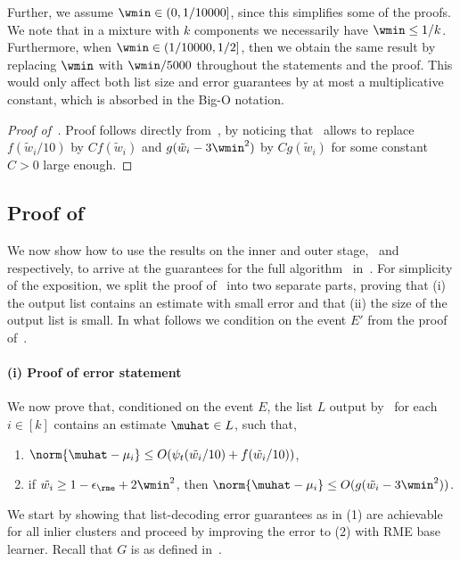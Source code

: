 Further, we assume $\wmin \in (0, 1/10000]$, since this simplifies some of the proofs. We note that in a mixture with $k$ components we necessarily have $\wmin \leq 1/k$. Furthermore, when \(\wmin \in (1/10000, 1/2]\), then we obtain the same result by replacing \(\wmin\) with \(\wmin / 5000\) throughout the statements and the proof. This would only affect both list size and error guarantees by at most a multiplicative constant, which is absorbed in the Big-O notation.

\begin{proof}[Proof of~]
Proof follows directly from~, by noticing that~ allows to replace \(f(\tilde w_i / 10)\) by \(C f(\tilde w_i)\) and \(g(\tilde w_i - 3 \wmin^2)\) by \(C g(\tilde w_i)\) for some constant \(C > 0\) large enough.
\end{proof}

\subsection{Proof of~ }
We now show how to use the results on the inner and outer stage,~ and~ respectively,
to arrive at the guarantees for the full algorithm~ in~.
For simplicity of the exposition, we split the proof of~ into two separate parts, proving that (i) the output list contains an estimate with small error and that (ii) the size of the output list is small.
In what follows we condition on the event $E'$ from the proof of~.

\paragraph{(i) Proof of error statement}

We now prove that, conditioned on the event $E$, the list \(L\) output by~  for each \(i \in [k]\) contains  an estimate \(\muhat \in L\), such that,
\begin{enumerate}[(1)]
    \item $\norm{\muhat - \mu_i} \leq O(\psi_t(\tilde{w_i} / 10)+f(\tilde{w_i} / 10))$,
    \item if $\tilde{w_i} \geq 1-\epsilon_{\rme} + 2\wmin^2$, then $\norm{\muhat - \mu_i} \leq O(g(\tilde{w_i} - 3\wmin^2))$.
\end{enumerate}
We start by showing that list-decoding error guarantees as in (1) are achievable for all inlier clusters and proceed by improving the error to (2) with \textrm{RME} base learner. Recall that \(G\) is as defined in~.

